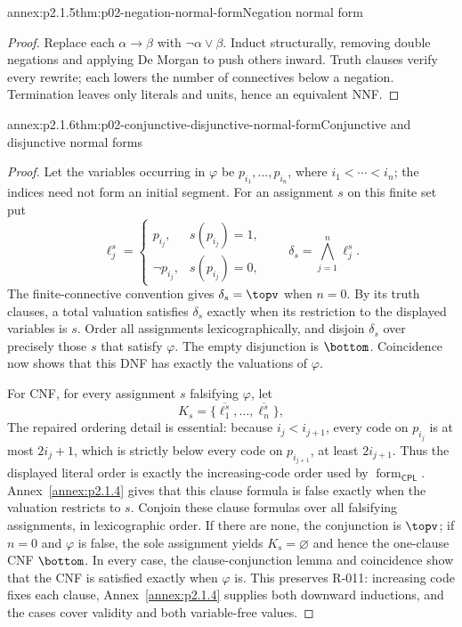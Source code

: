 \begin{annexitem}{annex:p2.1.5}{thm:p02-negation-normal-form}{Negation normal form}
\begin{proof}
Replace each \(\alpha\to\beta\) with \(\neg\alpha\lor\beta\).  Induct
structurally, removing double negations and applying De Morgan to push others
inward.  Truth clauses verify every rewrite; each lowers the number of
connectives below a negation.  Termination leaves only literals and units,
hence an equivalent NNF.
\end{proof}
\end{annexitem}

\begin{annexitem}{annex:p2.1.6}{thm:p02-conjunctive-disjunctive-normal-form}{Conjunctive and disjunctive normal forms}
\begin{proof}
Let the variables occurring in \(\varphi\) be
\(p_{i_1},\ldots,p_{i_n}\), where \(i_1<\cdots<i_n\); the indices need not
form an initial segment.  For an assignment \(s\) on this finite set put
\[
 \ell_j^s=
 \begin{cases}p_{i_j},&s(p_{i_j})=1,\\
 \neg p_{i_j},&s(p_{i_j})=0,
 \end{cases}
 \qquad
 \delta_s=\bigwedge_{j=1}^{n}\ell_j^s.
\]
The finite-connective convention gives \(\delta_s=\topv\) when \(n=0\).
By its truth clauses, a total valuation satisfies \(\delta_s\) exactly when
its restriction to the displayed variables is \(s\).  Order all assignments
lexicographically, and disjoin \(\delta_s\) over precisely those \(s\) that
satisfy \(\varphi\).  The empty disjunction is \(\bottom\).  Coincidence now
shows that this DNF has exactly the valuations of \(\varphi\).

For CNF, for every assignment \(s\) falsifying \(\varphi\), let
\[
 K_s=\{\overline{\ell_1^s},\ldots,
         \overline{\ell_n^s}\},
\]
The repaired ordering detail is essential: because
\(i_j<i_{j+1}\), every code on \(p_{i_j}\) is at most \(2i_j+1\), which
is strictly below every code on \(p_{i_{j+1}}\), at least \(2i_{j+1}\).
Thus the displayed literal order is exactly the increasing-code order used by
\(\operatorname{form}_{\mathsf{CPL}}\).  Annex~\ref{annex:p2.1.4} gives that
this clause formula is false exactly when the valuation restricts to \(s\).
Conjoin these clause formulas over all falsifying assignments, in
lexicographic order.  If there are none, the conjunction is \(\topv\); if
\(n=0\) and \(\varphi\) is false, the sole assignment yields
\(K_s=\varnothing\) and hence the one-clause CNF \(\bottom\).  In every case,
the clause-conjunction lemma and coincidence show that the CNF is satisfied
exactly when \(\varphi\) is.  This preserves R-011: increasing code fixes each
clause, Annex~\ref{annex:p2.1.4} supplies both downward inductions, and the
cases cover validity and both variable-free values.
\end{proof}
\end{annexitem}

